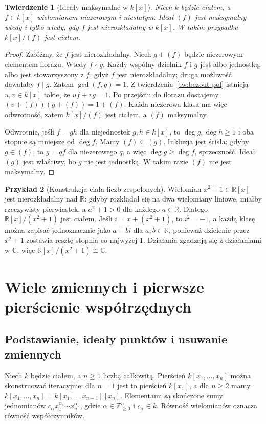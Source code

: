 \documentclass[11pt,a4paper,openany]{report}
\numberwithin{equation}{section}
\theoremstyle{plain}
\newtheorem{twierdzenie}{Twierdzenie}[section]
\theoremstyle{definition}
\newtheorem{przyklad}[twierdzenie]{Przykład}
\theoremstyle{remark}
\newcommand{\Z}{\mathbb Z}
\newcommand{\R}{\mathbb R}
\newcommand{\C}{\mathbb C}
\begin{document}
\begin{twierdzenie}[Ideały maksymalne w {$k[x]$}]
\label{tw:irreducible}
Niech $k$ będzie ciałem, a $f\in k[x]$ wielomianem niezerowym
i niestałym. Ideał $(f)$ jest maksymalny wtedy i tylko wtedy,
gdy $f$ jest nierozkładalny w $k[x]$. W takim przypadku
$k[x]/(f)$ jest ciałem.
\end{twierdzenie}
\begin{proof}
Załóżmy, że $f$ jest nierozkładalny.
Niech $g+(f)$ będzie niezerowym elementem ilorazu.
Wtedy $f\nmid g$. Każdy wspólny dzielnik $f$ i $g$
jest albo jednostką, albo jest stowarzyszony z $f$,
gdyż $f$ jest nierozkładalny; druga możliwość dawałaby $f\mid g$.
Zatem $\gcd(f,g)=1$. Z twierdzenia~\ref{tw:bezout-pol}
istnieją $u,v\in k[x]$ takie, że $uf+vg=1$.
Po przejściu do ilorazu dostajemy
$(v+(f))(g+(f))=1+(f)$. Każda niezerowa klasa ma więc odwrotność,
zatem $k[x]/(f)$ jest ciałem, a $(f)$ maksymalny.

Odwrotnie, jeśli $f=gh$ dla niejednostek $g,h\in k[x]$,
to $\deg g,\deg h\ge1$ i oba stopnie są mniejsze od $\deg f$.
Mamy $(f)\subseteq(g)$. Inkluzja jest ścisła:
gdyby $g\in(f)$, to $g=qf$ dla niezerowego $q$,
a więc $\deg g\ge\deg f$, sprzeczność.
Ideał $(g)$ jest właściwy, bo $g$ nie jest jednostką.
W takim razie $(f)$ nie jest maksymalny.
\end{proof}

\begin{przyklad}[Konstrukcja ciała liczb zespolonych]
Wielomian $x^2+1\in\R[x]$ jest nierozkładalny nad $\R$:
gdyby rozkładał się na dwa wielomiany liniowe,
miałby rzeczywisty pierwiastek, a $a^2+1>0$ dla każdego $a\in\R$.
Dlatego $\R[x]/(x^2+1)$ jest ciałem.
Jeśli $i=x+(x^2+1)$, to $i^2=-1$, a każdą klasę można zapisać
jednoznacznie jako $a+bi$ dla $a,b\in\R$,
ponieważ dzielenie przez $x^2+1$ zostawia resztę stopnia co najwyżej $1$.
Działania zgadzają się z działaniami w $\C$,
więc $\R[x]/(x^2+1)\cong\C$.
\end{przyklad}

\section{Wiele zmiennych i pierwsze pierścienie współrzędnych}

\subsection{Podstawianie, ideały punktów i usuwanie zmiennych}

Niech $k$ będzie ciałem, a $n\ge1$ liczbą całkowitą.
Pierścień $k[x_1,\dots,x_n]$
można skonstruować iteracyjnie: dla $n=1$ jest to
pierścień $k[x_1]$, a dla $n\ge2$ mamy
$k[x_1,\dots,x_n]=k[x_1,\dots,x_{n-1}][x_n]$.
Elementami są skończone sumy jednomianów
$c_{\alpha}x_1^{\alpha_1}\cdots x_n^{\alpha_n}$,
gdzie $\alpha\in\Z_{\ge0}^n$ i $c_\alpha\in k$.
Równość wielomianów oznacza równość współczynników.
\end{document}
